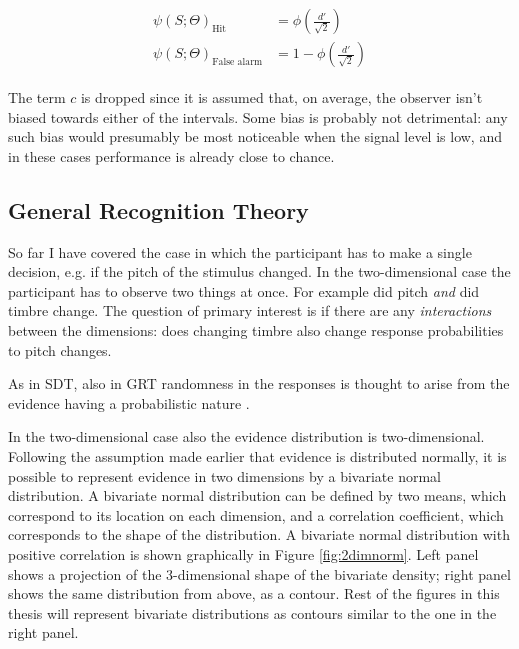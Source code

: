 \documentclass{article}\usepackage{knitr}
\begin{document}
\begin{align*}
\begin{split}
\psi(S; \Theta)_{\text{Hit}} &= \phi(\frac{d'}{\sqrt{2}}) \\
\psi(S; \Theta)_{\text{False alarm}} &=  1 - \phi(\frac{d'}{\sqrt{2}})
\end{split}
\end{align*}

The term $c$ is dropped since it is assumed that, on average, the observer isn't biased towards either of the intervals. Some bias is probably not detrimental: any such bias would presumably be most noticeable when the signal level is low, and in these cases performance is already close to chance. 



\subsection{General Recognition Theory}
\label{sec:grt_mdls}

So far I have covered the case in which the participant has to make a single decision, e.g. if the pitch of the stimulus changed. In the two-dimensional case the participant has to observe two things at once. For example did pitch \textit{and} did timbre change. The question of primary interest is if there are any \textit{interactions} between the dimensions: does changing timbre also change response probabilities to pitch changes.

As in SDT, also in GRT randomness in the responses is thought to arise from the evidence having a probabilistic nature \citep{ashby1986, ashby2015, kadlec1992}. 

In the two-dimensional case also the evidence distribution is two-dimensional. Following the assumption made earlier that evidence is distributed normally, it is possible to represent evidence in two dimensions by a bivariate normal distribution. A bivariate normal distribution can be defined by two means, which correspond to its location on each dimension, and a correlation coefficient, which corresponds to the shape of the distribution. A bivariate normal distribution with positive correlation is shown graphically in Figure \ref{fig:2dimnorm}. Left panel shows a projection of the 3-dimensional shape of the bivariate density; right panel shows the same distribution from above, as a contour. Rest of the figures in this thesis will represent bivariate distributions as contours similar to the one in the right panel.
\end{document}
